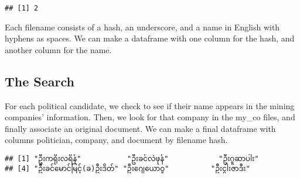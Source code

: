 \documentclass[
]{article}
\newenvironment{Shaded}{\begin{snugshade}}{\end{snugshade}}
\newcommand{\DecValTok}[1]{\textcolor[rgb]{0.00,0.00,0.81}{#1}}
\newcommand{\FunctionTok}[1]{\textcolor[rgb]{0.00,0.00,0.00}{#1}}
\newcommand{\NormalTok}[1]{#1}
\newcommand{\OtherTok}[1]{\textcolor[rgb]{0.56,0.35,0.01}{#1}}
\newcommand{\SpecialCharTok}[1]{\textcolor[rgb]{0.00,0.00,0.00}{#1}}
\newcommand{\StringTok}[1]{\textcolor[rgb]{0.31,0.60,0.02}{#1}}
\begin{document}
\begin{verbatim}
## [1] 2
\end{verbatim}

Each filename consists of a hash, an underscore, and a name in English
with hyphens as spaces. We can make a dataframe with one column for the
hash, and another column for the name.

\begin{Shaded}
\end{Shaded}

\hypertarget{the-search}{%
\subsection{The Search}\label{the-search}}

For each political candidate, we check to see if their name appears in
the mining companies' information. Then, we look for that company in the
my\_co files, and finally associate an original document. We can make a
final dataframe with columns politician, company, and document by
filename hash.

\begin{Shaded}
\end{Shaded}

\begin{verbatim}
## [1] "ဦးကရိုးလရိန်"           "ဦးခင်လဲဖုန်"            "ဦးဂူဆာပါး"          
## [4] "ဦးခင်မောင်မြင့်(ခ)ဦးဒိတ်" "ဦးဂျေယောဝူ"          "ဦးငွါးဇာဒီး"
\end{verbatim}
\end{document}
